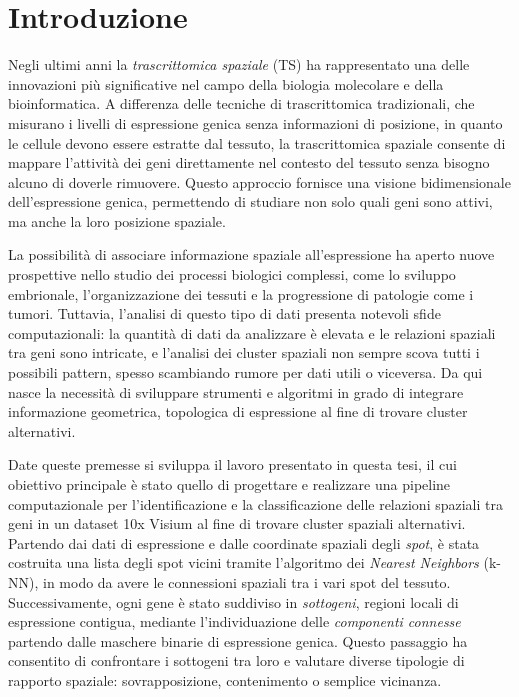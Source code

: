\chapter{Introduzione}\label{chapter:introduzione} 
Negli ultimi anni la \textit{trascrittomica spaziale} (TS) ha rappresentato una delle innovazioni
più significative nel campo della biologia molecolare e della bioinformatica.  
A differenza delle tecniche di trascrittomica tradizionali, che misurano i livelli di espressione genica senza
informazioni di posizione, in quanto le cellule devono essere estratte dal tessuto, la trascrittomica spaziale consente di mappare l'attività dei geni direttamente nel contesto
del tessuto senza bisogno alcuno di doverle rimuovere.  
Questo approccio fornisce una visione bidimensionale dell'espressione genica, permettendo di studiare
non solo quali geni sono attivi, ma anche la loro posizione spaziale.

La possibilità di associare informazione spaziale all'espressione ha aperto nuove prospettive nello studio dei processi
biologici complessi, come lo sviluppo embrionale, l'organizzazione dei tessuti e la progressione di patologie come i
tumori. Tuttavia, l'analisi di questo tipo di dati presenta notevoli sfide computazionali: la quantità di dati da analizzare
è elevata e le relazioni spaziali tra geni sono intricate, e l'analisi dei cluster spaziali non sempre scova tutti i possibili pattern, spesso scambiando rumore per dati utili o viceversa.  
Da qui nasce la necessità di sviluppare strumenti e algoritmi in grado di integrare informazione geometrica, topologica di espressione al fine di trovare cluster alternativi.

\medskip
Date queste premesse si sviluppa il lavoro presentato in questa tesi, il cui obiettivo principale è stato quello di
progettare e realizzare una pipeline computazionale per l'identificazione e la classificazione delle relazioni spaziali
tra geni in un dataset 10x Visium al fine di trovare cluster spaziali alternativi.  
Partendo dai dati di espressione e dalle coordinate spaziali degli \textit{spot}, è stata costruita una lista degli spot vicini
tramite l'algoritmo dei \textit{Nearest Neighbors} (k-NN), in modo da avere le connessioni spaziali tra i vari spot del tessuto.  
Successivamente, ogni gene è stato suddiviso in \textit{sottogeni}, regioni locali di espressione contigua, mediante
l'individuazione delle \textit{componenti connesse} partendo dalle maschere binarie di espressione genica.  
Questo passaggio ha consentito di confrontare i sottogeni tra loro
e valutare diverse tipologie di rapporto spaziale: sovrapposizione, contenimento o semplice vicinanza.

